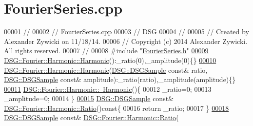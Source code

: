 \hypertarget{_fourier_series_8cpp_source}{\section{Fourier\+Series.\+cpp}
\label{_fourier_series_8cpp_source}
}

\begin{DoxyCode}
00001 \textcolor{comment}{//}
00002 \textcolor{comment}{//  FourierSeries.cpp}
00003 \textcolor{comment}{//  DSG}
00004 \textcolor{comment}{//}
00005 \textcolor{comment}{//  Created by Alexander Zywicki on 11/18/14.}
00006 \textcolor{comment}{//  Copyright (c) 2014 Alexander Zywicki. All rights reserved.}
00007 \textcolor{comment}{//}
00008 \textcolor{preprocessor}{#include "\hyperlink{_fourier_series_8h}{FourierSeries.h}"}
\hypertarget{_fourier_series_8cpp_source_l00009}{}\hyperlink{class_d_s_g_1_1_fourier_1_1_harmonic_a5433617eaac39402d27ce24634140940}{00009} \hyperlink{class_d_s_g_1_1_fourier_1_1_harmonic_a5433617eaac39402d27ce24634140940}{DSG::Fourier::Harmonic::Harmonic}():\_ratio(0),\_amplitude(0)\{\}
\hypertarget{_fourier_series_8cpp_source_l00010}{}\hyperlink{class_d_s_g_1_1_fourier_1_1_harmonic_a1dbca63f18e7271f78ad466bacdad394}{00010} \hyperlink{class_d_s_g_1_1_fourier_1_1_harmonic_a5433617eaac39402d27ce24634140940}{DSG::Fourier::Harmonic::Harmonic}(\hyperlink{namespace_d_s_g_ac39a94cd27ebcd9c1e7502d0c624894a}{DSG::DSGSample} \textcolor{keyword}{const}& ratio,
      \hyperlink{namespace_d_s_g_ac39a94cd27ebcd9c1e7502d0c624894a}{DSG::DSGSample} \textcolor{keyword}{const}& amplitude):\_ratio(ratio),\_amplitude(amplitude)\{\}
\hypertarget{_fourier_series_8cpp_source_l00011}{}\hyperlink{class_d_s_g_1_1_fourier_1_1_harmonic_aad4e5d3e4ef8cd53bf01b0624246b826}{00011} \hyperlink{class_d_s_g_1_1_fourier_1_1_harmonic_aad4e5d3e4ef8cd53bf01b0624246b826}{DSG::Fourier::Harmonic::~Harmonic}()\{
00012     \_ratio=0;
00013     \_amplitude=0;
00014 \}
\hypertarget{_fourier_series_8cpp_source_l00015}{}\hyperlink{class_d_s_g_1_1_fourier_1_1_harmonic_a26b2ccbb2f25f72040a555c51dc43672}{00015} \hyperlink{namespace_d_s_g_ac39a94cd27ebcd9c1e7502d0c624894a}{DSG::DSGSample} \textcolor{keyword}{const}& \hyperlink{class_d_s_g_1_1_fourier_1_1_harmonic_a26b2ccbb2f25f72040a555c51dc43672}{DSG::Fourier::Harmonic::Ratio}()\textcolor{keyword}{const}\{
00016     \textcolor{keywordflow}{return} \_ratio;
00017 \}
\hypertarget{_fourier_series_8cpp_source_l00018}{}\hyperlink{class_d_s_g_1_1_fourier_1_1_harmonic_a013dc7cae9bd09dbc26193f5b501776f}{00018} \hyperlink{namespace_d_s_g_ac39a94cd27ebcd9c1e7502d0c624894a}{DSG::DSGSample} \textcolor{keyword}{const}& \hyperlink{class_d_s_g_1_1_fourier_1_1_harmonic_a26b2ccbb2f25f72040a555c51dc43672}{DSG::Fourier::Harmonic::Ratio}(

\end{DoxyCode}
